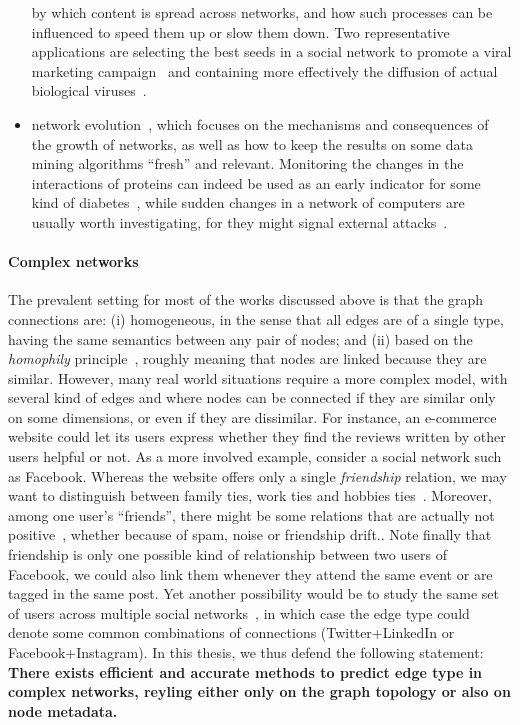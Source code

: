 \begin{itemize}[nosep,leftmargin=*]
    by which content is spread across networks, and how such processes can be influenced to speed
    them up or slow them down. Two representative applications are selecting the best seeds in a social
    network to promote a viral marketing campaign~\autocite{infmaxKempe15} and containing more effectively the
    diffusion of actual biological viruses~\autocite{influenceBio13}.
  \item network evolution~\autocite{networkEvolution14}, which focuses on the mechanisms and
    consequences of the growth of networks, as well as how to keep the results on some data
    mining algorithms \enquote{fresh} and relevant. Monitoring the changes in the interactions of
    proteins can indeed be used as an early indicator for some kind of
    diabetes~\autocite{evolBio10}, while sudden changes in a network of computers are usually worth
    investigating, for they might signal external attacks~\autocite{evolSecurity04}.
\end{itemize}

\vspace{-\baselineskip}
\paragraph{Complex networks}

The prevalent setting for most of the works discussed above is that the graph connections are: (i)
homogeneous, in the sense that all edges are of a single type, having the same semantics  between
any pair of nodes; and (ii) based on the \emph{homophily} principle~\autocite{Homophily01}, roughly
meaning that nodes are linked because they are similar. However, many real world situations require
a more complex model, with several kind of edges and where nodes can be connected if they are
similar only on some dimensions, or even if they are dissimilar. For instance, an e-commerce website
could let its users express whether they find the reviews written by other users helpful or not. As a
more involved example, consider a social network such as Facebook. Whereas the website offers only a
single \emph{friendship} relation, we may want to distinguish between family ties, work ties and
hobbies ties~\autocite{LeskovecEgo12}. Moreover, among one user's \enquote{friends}, there might be some
relations that are actually not positive~\autocite{Yang2012}, whether because of spam, noise or
friendship drift.. Note finally that friendship is only one possible kind of relationship between two
users of Facebook, we could also link them whenever they attend the same event or are tagged in the
same post. Yet another possibility would be to study the same set of users across multiple social
networks~\autocite{mergingNetworks16}, in which case the edge type could denote some common
combinations of connections (\eg Twitter+LinkedIn or Facebook+Instagram). In this thesis, we thus
defend the following statement: \textbf{There exists efficient and accurate methods to predict edge
type in complex networks, reyling either only on the graph topology or also on node metadata.}

